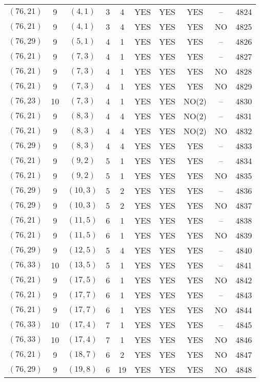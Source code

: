 \begin{longtable}{|c|c|c|c|c|c|c|c|c|c|}
$(76, 21)$ & 9 & $(4, 1)$ & 3 & 4 & YES & YES & YES & -- & 4824\\
$(76, 21)$ & 9 & $(4, 1)$ & 3 & 4 & YES & YES & YES & NO & 4825\\
$(76, 29)$ & 9 & $(5, 1)$ & 4 & 1 & YES & YES & YES & -- & 4826\\
$(76, 21)$ & 9 & $(7, 3)$ & 4 & 1 & YES & YES & YES & -- & 4827\\
$(76, 21)$ & 9 & $(7, 3)$ & 4 & 1 & YES & YES & YES & NO & 4828\\
$(76, 21)$ & 9 & $(7, 3)$ & 4 & 1 & YES & YES & YES & NO & 4829\\
$(76, 23)$ & 10 & $(7, 3)$ & 4 & 1 & YES & YES & NO(2) & -- & 4830\\
$(76, 21)$ & 9 & $(8, 3)$ & 4 & 4 & YES & YES & NO(2) & -- & 4831\\
$(76, 21)$ & 9 & $(8, 3)$ & 4 & 4 & YES & YES & NO(2) & NO & 4832\\
$(76, 29)$ & 9 & $(8, 3)$ & 4 & 4 & YES & YES & YES & -- & 4833\\
$(76, 21)$ & 9 & $(9, 2)$ & 5 & 1 & YES & YES & YES & -- & 4834\\
$(76, 21)$ & 9 & $(9, 2)$ & 5 & 1 & YES & YES & YES & NO & 4835\\
$(76, 29)$ & 9 & $(10, 3)$ & 5 & 2 & YES & YES & YES & -- & 4836\\
$(76, 29)$ & 9 & $(10, 3)$ & 5 & 2 & YES & YES & YES & NO & 4837\\
$(76, 21)$ & 9 & $(11, 5)$ & 6 & 1 & YES & YES & YES & -- & 4838\\
$(76, 21)$ & 9 & $(11, 5)$ & 6 & 1 & YES & YES & YES & NO & 4839\\
$(76, 29)$ & 9 & $(12, 5)$ & 5 & 4 & YES & YES & YES & -- & 4840\\
$(76, 33)$ & 10 & $(13, 5)$ & 5 & 1 & YES & YES & YES & -- & 4841\\
$(76, 21)$ & 9 & $(17, 5)$ & 6 & 1 & YES & YES & YES & NO & 4842\\
$(76, 21)$ & 9 & $(17, 7)$ & 6 & 1 & YES & YES & YES & -- & 4843\\
$(76, 21)$ & 9 & $(17, 7)$ & 6 & 1 & YES & YES & YES & NO & 4844\\
$(76, 33)$ & 10 & $(17, 4)$ & 7 & 1 & YES & YES & YES & -- & 4845\\
$(76, 33)$ & 10 & $(17, 4)$ & 7 & 1 & YES & YES & YES & NO & 4846\\
$(76, 21)$ & 9 & $(18, 7)$ & 6 & 2 & YES & YES & YES & NO & 4847\\
$(76, 29)$ & 9 & $(19, 8)$ & 6 & 19 & YES & YES & YES & NO & 4848\\

\end{longtable}
